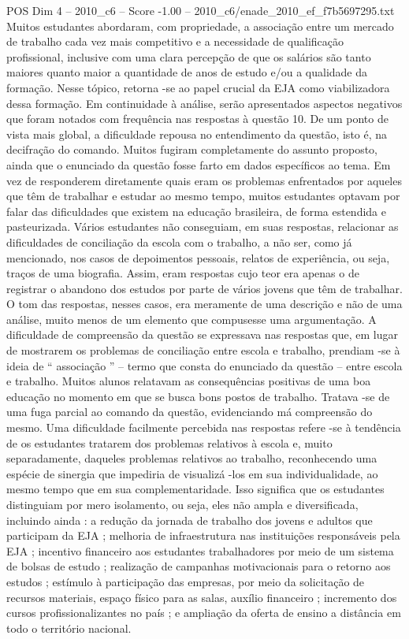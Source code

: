 \begin{textsample}{POS Dim 4 – 2010\_c6 – Score -1.00 – 2010\_c6/enade\_2010\_ef\_f7b5697295.txt}
Muitos estudantes abordaram, com propriedade, a associação entre um mercado de trabalho cada vez mais competitivo e a necessidade de qualificação profissional, inclusive com uma clara percepção de que os salários são tanto maiores quanto maior a quantidade de anos de estudo e/ou a qualidade da formação.
Nesse tópico, retorna -se ao papel crucial da EJA como viabilizadora dessa formação.
Em continuidade à análise, serão apresentados aspectos negativos que foram notados com frequência nas respostas à questão 10.
De um ponto de vista mais global, a dificuldade repousa no entendimento da questão, isto é, na decifração do comando.
Muitos fugiram completamente do assunto proposto, ainda que o enunciado da questão fosse farto em dados específicos ao tema.
Em vez de responderem diretamente quais eram os problemas enfrentados por aqueles que têm de trabalhar e estudar ao mesmo tempo, muitos estudantes optavam por falar das dificuldades que existem na educação brasileira, de forma estendida e pasteurizada.
Vários estudantes não conseguiam, em suas respostas, relacionar as dificuldades de conciliação da escola com o trabalho, a não ser, como já mencionado, nos casos de depoimentos pessoais, relatos de experiência, ou seja, traços de uma biografia.
Assim, eram respostas cujo teor era apenas o de registrar o abandono dos estudos por parte de vários jovens que têm de trabalhar.
O tom das respostas, nesses casos, era meramente de uma descrição e não de uma análise, muito menos de um elemento que compusesse uma argumentação.
A dificuldade de compreensão da questão se expressava nas respostas que, em lugar de mostrarem os problemas de conciliação entre escola e trabalho, prendiam -se à ideia de “ associação ” – termo que consta do enunciado da questão – entre escola e trabalho.
Muitos alunos relatavam as consequências positivas de uma boa educação no momento em que se busca bons postos de trabalho.
Tratava -se de uma fuga parcial ao comando da questão, evidenciando má compreensão do mesmo.
Uma dificuldade facilmente percebida nas respostas refere -se à tendência de os estudantes tratarem dos problemas relativos à escola e, muito separadamente, daqueles problemas relativos ao trabalho, reconhecendo uma espécie de sinergia que impediria de visualizá -los em sua individualidade, ao mesmo tempo que em sua complementaridade.
Isso significa que os estudantes distinguiam por mero isolamento, ou seja, eles não ampla e diversificada, incluindo ainda : a redução da jornada de trabalho dos jovens e adultos que participam da EJA ; melhoria de infraestrutura nas instituições responsáveis pela EJA ; incentivo financeiro aos estudantes trabalhadores por meio de um sistema de bolsas de estudo ; realização de campanhas motivacionais para o retorno aos estudos ; estímulo à participação das empresas, por meio da solicitação de recursos materiais, espaço físico para as salas, auxílio financeiro ; incremento dos cursos profissionalizantes no país ; e ampliação da oferta de ensino a distância em todo o território nacional.

\end{textsample}
